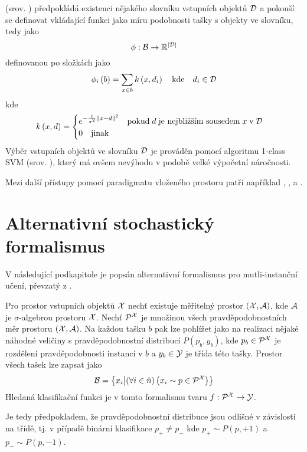  (srov. \cite{chen_miles:_2006}) předpokládá existenci nějakého slovníku vstupních objektů \( \mathcal D \) a pokouší se definovat vkládající funkci jako míru podobnosti tašky s objekty ve slovníku, tedy jako
\[ \phi : \mathcal B \to \mathbb R^{\left| \mathcal D \right|} \]
definovanou po složkách jako
\[ \phi_i \left( b \right) = \sum_{x \in b} k \left( x, d_i \right) \quad \text{kde} \quad d_i \in \mathcal D \]
kde
\[ k \left( x, d \right) = \begin{cases}
	e^{- \frac{1}{\sigma^2} \left\Vert x - d \right\Vert^2} \quad \text{pokud} \; d \; \text{je nejbližším sousedem} \; x \; \text{v} \; \mathcal D \\
	0 \quad \text{jinak}
\end{cases} \]
Výběr vstupních objektů ve slovníku \( \mathcal D \) je prováděn pomocí algoritmu 1-class SVM (srov. \cite{zhu_1-norm_2004}), který má ovšem nevýhodu v podobě velké výpočetní náročnosti.

Mezi další přístupy pomocí paradigmatu vloženého prostoru patří například \cite{cheplygina_multiple_2015}, \cite{chen_image_2004}, \cite{foulds_learning_2008} a \cite{zhang_multi-instance_2009}.

\section{Alternativní stochastický formalismus}
V následující podkapitole je popsán alternativní formalismus pro mutli-instanční učení, převzatý z \cite{muandet_learning_2012}.

Pro prostor vstupních objektů \( \mathcal X \) nechť existuje měřitelný prostor \( \left( \mathcal X, \mathcal A \right) \), kde \( \mathcal A \) je \( \sigma \)-algebrou prostoru \( \mathcal X \). Nechť \( \mathcal P^{\mathcal X} \) je množinou všech pravděpodobnostních měr prostoru \( \left( \mathcal X, \mathcal A \right) \). Na každou tašku \( b \) pak lze pohlížet jako na realizaci nějaké náhodné veličiny s pravděpodobnostní distribucí \( P \left( p_b, y_b \right) \), kde \( p_b \in \mathcal P^{\mathcal X} \) je rozdělení pravděpodobnosti instancí v \( b \) a \( y_b \in \mathcal Y \) je třída této tašky. Prostor všech tašek lze zapsat jako
\[ \mathcal B = \left\{ x_i \middle| \left( \forall i \in \hat n \right) \left( x_i \sim p \in \mathcal P^{\mathcal X} \right) \right\} \]
Hledaná klasifikační funkci je v tomto formalismu tvaru \( f : \mathcal P^{\mathcal X} \to \mathcal Y \).

Je tedy předpokladem, že pravděpodobnostní distribuce jsou odlišné v závislosti na třídě, tj. v případě binární klasifikace \( p_+ \neq p_- \) kde \( p_+ \sim P(p, +1) \) a \( p_- \sim P(p, -1) \).

